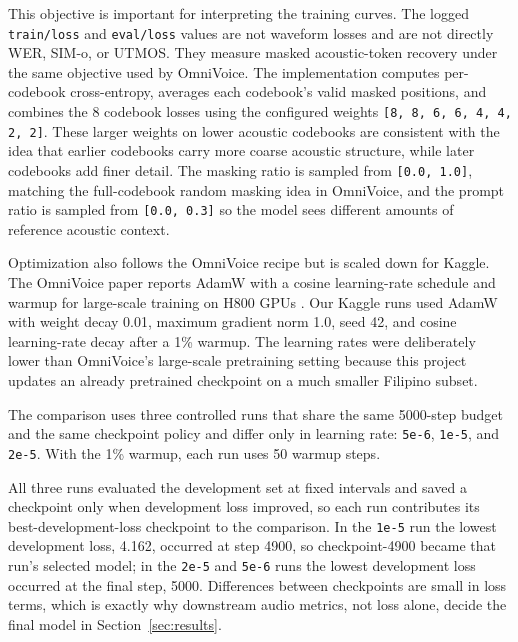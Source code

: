 \documentclass[11pt]{article}
\begin{document}
This objective is important for interpreting the training curves. The logged \texttt{train/loss} and \texttt{eval/loss} values are not waveform losses and are not directly WER, SIM-o, or UTMOS. They measure masked acoustic-token recovery under the same objective used by OmniVoice. The implementation computes per-codebook cross-entropy, averages each codebook's valid masked positions, and combines the 8 codebook losses using the configured weights \texttt{[8, 8, 6, 6, 4, 4, 2, 2]}. These larger weights on lower acoustic codebooks are consistent with the idea that earlier codebooks carry more coarse acoustic structure, while later codebooks add finer detail. The masking ratio is sampled from \texttt{[0.0, 1.0]}, matching the full-codebook random masking idea in OmniVoice, and the prompt ratio is sampled from \texttt{[0.0, 0.3]} so the model sees different amounts of reference acoustic context.

Optimization also follows the OmniVoice recipe but is scaled down for Kaggle. The OmniVoice paper reports AdamW with a cosine learning-rate schedule and warmup for large-scale training on H800 GPUs \citep{omnivoice}. Our Kaggle runs used AdamW with weight decay 0.01, maximum gradient norm 1.0, seed 42, and cosine learning-rate decay after a 1\% warmup. The learning rates were deliberately lower than OmniVoice's large-scale pretraining setting because this project updates an already pretrained checkpoint on a much smaller Filipino subset.

The comparison uses three controlled runs that share the same 5000-step budget and the same checkpoint policy and differ only in learning rate: \texttt{5e-6}, \texttt{1e-5}, and \texttt{2e-5}. With the 1\% warmup, each run uses 50 warmup steps.

All three runs evaluated the development set at fixed intervals and saved a checkpoint only when development loss improved, so each run contributes its best-development-loss checkpoint to the comparison. In the \texttt{1e-5} run the lowest development loss, 4.162, occurred at step 4900, so checkpoint-4900 became that run's selected model; in the \texttt{2e-5} and \texttt{5e-6} runs the lowest development loss occurred at the final step, 5000. Differences between checkpoints are small in loss terms, which is exactly why downstream audio metrics, not loss alone, decide the final model in Section~\ref{sec:results}.
\end{document}
